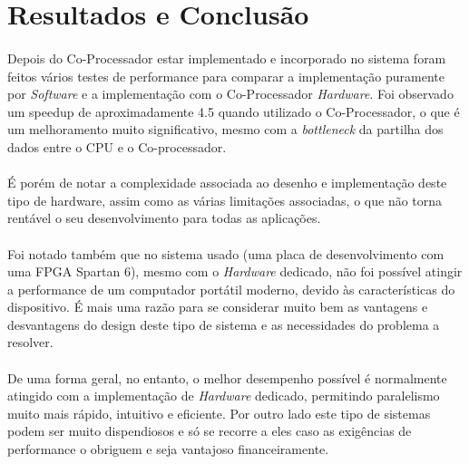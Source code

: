 \section{Resultados e Conclusão}

\paragraph{} Depois do Co-Processador estar implementado e incorporado no sistema foram feitos vários testes de performance para comparar a implementação puramente por \textit{Software} e a implementação com o Co-Processador \textit{Hardware}.
Foi observado um speedup de aproximadamente 4.5 quando utilizado o Co-Processador, o que é um melhoramento muito significativo, mesmo com a \textit{bottleneck} da partilha dos dados entre o CPU e o Co-processador.

\paragraph{} É porém de notar a complexidade associada ao desenho e implementação deste tipo de hardware, assim como as várias limitações associadas, o que não torna rentável o seu desenvolvimento para todas as aplicações. 

\paragraph{} Foi notado também que no sistema usado (uma placa de desenvolvimento com uma FPGA Spartan 6), mesmo com o \textit{Hardware} dedicado, não foi possível atingir a performance de um computador portátil moderno, devido às características do dispositivo. É mais uma razão para se considerar muito bem as vantagens e desvantagens do design deste tipo de sistema e as necessidades do problema a resolver.

\paragraph{} De uma forma geral, no entanto, o melhor desempenho possível é normalmente atingido com a implementação de \textit{Hardware} dedicado, permitindo paralelismo muito mais rápido, intuitivo e eficiente. Por outro lado este tipo de sistemas podem ser muito dispendiosos e só se recorre a eles caso as exigências de performance o obriguem e seja vantajoso financeiramente.

